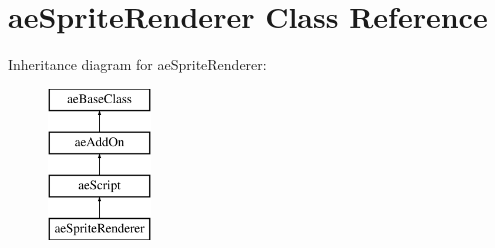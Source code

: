 \hypertarget{classae_sprite_renderer}{}\section{ae\+Sprite\+Renderer Class Reference}
\label{classae_sprite_renderer}
Inheritance diagram for ae\+Sprite\+Renderer\+:\begin{figure}[H]
\begin{center}
\leavevmode
\includegraphics[height=4.000000cm]{classae_sprite_renderer}
\end{center}
\end{figure}
